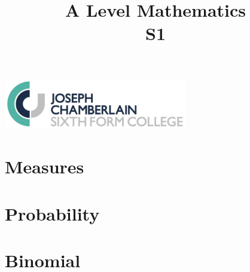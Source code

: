 \documentclass[12pt]{article}
\title{A Level Mathematics \\ S1}
\author{}
\date{}
\begin{document}

\maketitle

\begin{center}
\includegraphics[width=8cm]{../jcclogo.PNG}
\end{center}

\newpage

\thispagestyle{plain}
\tableofcontents


			\newpage
			\section{Measures}

			
				\newpage
				

				
				\newpage
				

				
				\newpage
				

				
				\newpage
				

				
				\newpage
				

				
			\newpage
			\section{Probability}

			
				\newpage
				

				
				\newpage
				

				
				\newpage
				

				
				\newpage
				

				
				\newpage
				

				
			\newpage
			\section{Binomial}

			
				\newpage
				
\end{document}
